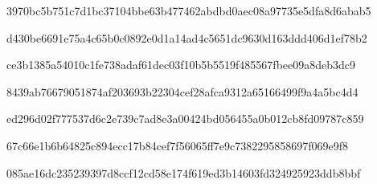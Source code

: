 \par\noindent\begin{minipage}{\linewidth}
\par
{\footnotesize\ttfamily 3970bc5b751c7d1bc37104bbe63b477462abdbd0aec08a97735e5dfa8d6abab5}\par
\end{minipage}\par\smallskip
\par\noindent\begin{minipage}{\linewidth}
\par
{\footnotesize\ttfamily d430be6691e75a4c65b0c0892e0d1a14ad4c5651dc9630d163ddd406d1ef78b2}\par
\end{minipage}\par\smallskip
\par\noindent\begin{minipage}{\linewidth}
\par
{\footnotesize\ttfamily ce3b1385a54010c1fe738adaf61dec03f10b5b5519f485567fbee09a8deb3dc9}\par
\end{minipage}\par\smallskip
\par\noindent\begin{minipage}{\linewidth}
\par
{\footnotesize\ttfamily 8439ab76679051874af203693b22304cef28afca9312a65166499f9a4a5bc4d4}\par
\end{minipage}\par\smallskip
\par\noindent\begin{minipage}{\linewidth}
\par
{\footnotesize\ttfamily ed296d02f777537d6c2e739c7ad8e3a00424bd056455a0b012cb8fd09787c859}\par
\end{minipage}\par\smallskip
\par\noindent\begin{minipage}{\linewidth}
\par
{\footnotesize\ttfamily 67c66e1b6b64825c894ecc17b84cef7f56065ff7e9c7382295858697f069e9f8}\par
\end{minipage}\par\smallskip
\par\noindent\begin{minipage}{\linewidth}
\par
{\footnotesize\ttfamily 085ae16dc235239397d8ccf12cd58e174f619ed3b14603fd324925923ddb8bbf}\par
\end{minipage}\par\smallskip
